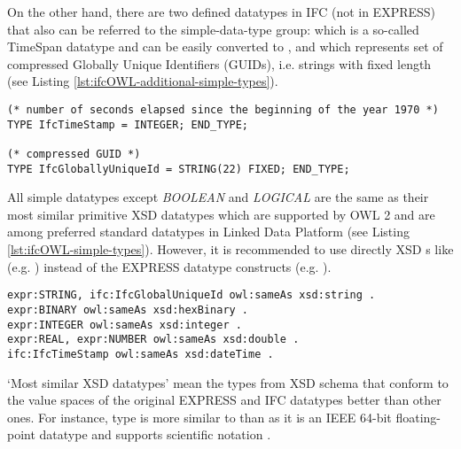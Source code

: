 On the other hand, there are two defined data\-types in IFC (not in EXPRESS) that also can be referred to the simple-data-type group:  which is a so-called TimeSpan data\-type and can be easily converted to , and  which represents set of compressed Globally Unique Identifiers (GUIDs), i.e. strings with fixed length (see Listing \ref{lst:ifcOWL-additional-simple-types}). 

\begin{lstlisting}[caption={Two defined data\-types considered as simple data\-types}, label=lst:ifcOWL-additional-simple-types]
(* number of seconds elapsed since the beginning of the year 1970 *)
TYPE IfcTimeStamp = INTEGER; END_TYPE;

(* compressed GUID *)
TYPE IfcGloballyUniqueId = STRING(22) FIXED; END_TYPE;
\end{lstlisting}

\begin{ontologyRule}
All simple data\-types except \emph{BOOLEAN} and \emph{LOGICAL} are the same as their most similar primitive XSD data\-types which are supported by OWL 2 \cite{w3c:owl2-profiles} and are among preferred standard data\-types in Linked Data Platform \cite{w3c:ldp-best-practices} (see Listing \ref{lst:ifcOWL-simple-types}). However, it is recommended to use directly XSD s like (e.g. ) instead of the EXPRESS data\-type constructs (e.g. ).
\end{ontologyRule}


\begin{lstlisting}[caption={Simple data types}, label=lst:ifcOWL-simple-types]
expr:STRING, ifc:IfcGlobalUniqueId owl:sameAs xsd:string .
expr:BINARY owl:sameAs xsd:hexBinary .
expr:INTEGER owl:sameAs xsd:integer .
expr:REAL, expr:NUMBER owl:sameAs xsd:double .
ifc:IfcTimeStamp owl:sameAs xsd:dateTime .
\end{lstlisting}

`Most similar XSD data\-types' mean the types from XSD schema that conform to the value spaces of the original EXPRESS and IFC data\-types better than other ones. For instance, type  is more similar to  than  as it is an IEEE 64-bit floating-point data\-type and supports scientific notation \cite{w3c:xsd,datapic:xsd}.

